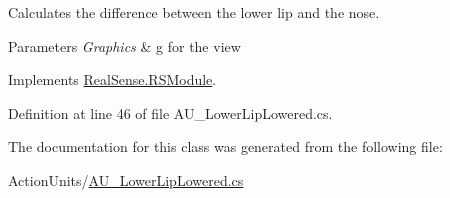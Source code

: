Calculates the difference between the lower lip and the nose. 
\begin{DoxyParams}{Parameters}
{\em Graphics} & g for the view \\
\hline
\end{DoxyParams}


Implements \hyperlink{class_real_sense_1_1_r_s_module_a2ec830b7932ee7c0077d473f81c73867}{Real\+Sense.\+R\+S\+Module}.



Definition at line 46 of file A\+U\+\_\+\+Lower\+Lip\+Lowered.\+cs.



The documentation for this class was generated from the following file\+:\begin{DoxyCompactItemize}
\item 
Action\+Units/\hyperlink{_a_u___lower_lip_lowered_8cs}{A\+U\+\_\+\+Lower\+Lip\+Lowered.\+cs}\end{DoxyCompactItemize}

